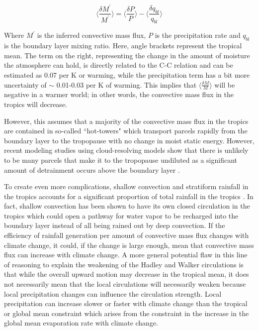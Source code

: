 \documentclass[letterpaper,12pt,titlepage,oneside,final]{book}
\begin{document}
\begin{equation}\label{eq:HS}
\Bigg\langle\frac{\delta{M^{'}}}{M^{'}}\Bigg\rangle=\Bigg\langle\frac{\delta{P}}{P}\Bigg\rangle-\Bigg\langle\frac{\delta{q_{bl}}}{q_{bl}}\Bigg\rangle
\end{equation}

Where $M^{'}$ is the inferred convective mass flux, $P$ is the precipitation rate and $q_{bl}$ is the boundary layer mixing ratio. Here, angle brackets represent the tropical mean. The term on the right, representing the change in the amount of moisture the atmosphere can hold, is directly related to the C-C relation and can be estimated as 0.07 per K or warming, while the precipitation term has a bit more uncertainty of $\sim$ 0.01-0.03 per K of warming. This implies that $\langle\frac{\delta{M}}{M}\rangle$ will be negative in a warmer world; in other words, the convective mass flux in the tropics will decrease. 

However, this assumes that a majority of the convective mass flux in the tropics are contained in so-called ``hot-towers" \citep{riehl_and_malkus_heat_1958} which transport parcels rapidly from the boundary layer to the tropopause with no change in moist static energy. However, recent modeling studies using cloud-resolving models show that there is unlikely to be many parcels that make it to the tropopause undiluted \citep{romps_undiluted_2010} as a significant amount of detrainment occurs above the boundary layer \citep{romps_direct_2010}. 

To create even more complications, shallow convection and stratiform rainfall in the tropics accounts for a significant proportion of total rainfall in the tropics \citep{schumacher_stratiform_2003}. In fact, shallow convection has been shown to have its own closed circulation in the tropics \citep{folkins_ian_low-level_2008} which could open a pathway for water vapor to be recharged into the boundary layer instead of all being rained out by deep convection. If the efficiency of rainfall generation per amount of convective mass flux changes with climate change, it could, if the change is large enough, mean that convective mass flux can increase with climate change. A more general potential flaw in this line of reasoning to explain the weakening of the Hadley and Walker circulations is that while the overall upward motion may decrease in the tropical mean, it does not necessarily mean that the local circulations will necessarily weaken \citep{merlis_changes_2011} because local precipitation changes can influence the circulation strength. Local precipitation can increase slower or faster with climate change than the tropical or global mean constraint which arises from the constraint in the increase in the global mean evaporation rate with climate change. 
\end{document}
